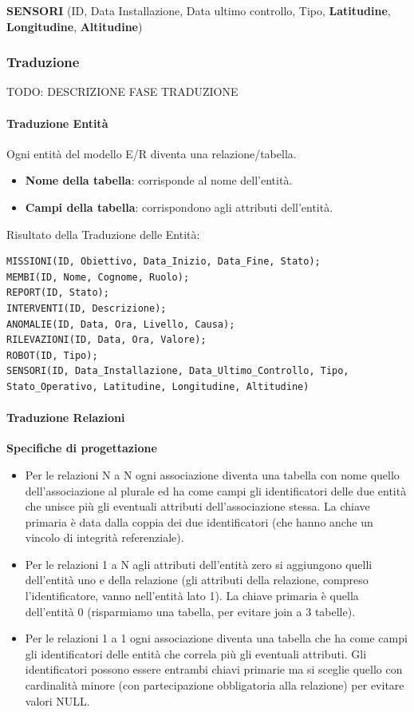 \documentclass{article}
\begin{document}
\textbf{SENSORI} (ID, Data Installazione, Data ultimo controllo, Tipo, \textbf{Latitudine}, \textbf{Longitudine}, \textbf{Altitudine})

\subsubsection{Traduzione}

TODO: DESCRIZIONE FASE TRADUZIONE

\paragraph{Traduzione Entità}

Ogni entità del modello E/R diventa una relazione/tabella.
\begin{itemize}
    \item \textbf{Nome della tabella}: corrisponde al nome dell’entità.
    \item \textbf{Campi della tabella}: corrispondono agli attributi dell’entità.
\end{itemize}

Risultato della Traduzione delle Entità:
\begin{verbatim}
MISSIONI(ID, Obiettivo, Data_Inizio, Data_Fine, Stato);
MEMBI(ID, Nome, Cognome, Ruolo);
REPORT(ID, Stato);
INTERVENTI(ID, Descrizione);
ANOMALIE(ID, Data, Ora, Livello, Causa);
RILEVAZIONI(ID, Data, Ora, Valore);
ROBOT(ID, Tipo);
SENSORI(ID, Data_Installazione, Data_Ultimo_Controllo, Tipo, Stato_Operativo, Latitudine, Longitudine, Altitudine)
\end{verbatim}

\paragraph{Traduzione Relazioni}

\textbf{Specifiche di progettazione}
\begin{itemize}
    \item Per le relazioni N a N ogni associazione diventa una tabella con nome quello dell’associazione al plurale ed ha come campi gli identificatori delle due entità che unisce più gli eventuali attributi dell’associazione stessa. La chiave primaria è data dalla coppia dei due identificatori (che hanno anche un vincolo di integrità referenziale).
    \item Per le relazioni 1 a N agli attributi dell’entità zero si aggiungono quelli dell’entità uno e della relazione (gli attributi della relazione, compreso l’identificatore, vanno nell’entità lato 1). La chiave primaria è quella dell’entità 0 (risparmiamo una tabella, per evitare join a 3 tabelle).
    \item Per le relazioni 1 a 1 ogni associazione diventa una tabella che ha come campi gli identificatori delle entità che correla più gli eventuali attributi. Gli identificatori possono essere entrambi chiavi primarie ma si sceglie quello con cardinalità minore (con partecipazione obbligatoria alla relazione) per evitare valori NULL.
\end{itemize}
\end{document}
